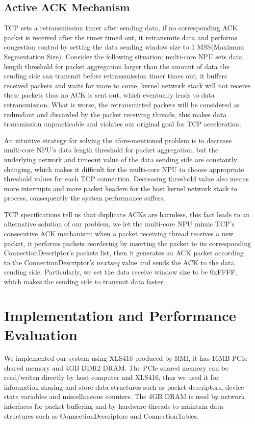 \documentclass[conference]{IEEEtran}
\begin{document}
\subsection{Active ACK Mechanism}
TCP sets a retransmission timer after sending data, if no corresponding ACK packet is received after the timer timed out, it retransmits data and performs congestion control by setting the data sending window size to 1 MSS(Maximum Segmentation Size). Consider the following situation: multi-core NPU sets data length threshold for packet aggregation larger than the amount of data the sending side can transmit before retransmission timer times out, it buffers received packets and waits for more to come, kernel network stack will not receive these packets thus no ACK is sent out, which eventually leads to data retransmission. What is worse, the retransmitted packets will be considered as redundant and discarded by the packet receiving threads, this makes data transmission unpracticable and violates our original goal for TCP acceleration.

 An intuitive strategy for solving the afore-mentioned problem is to decrease multi-core NPU's data length threshold for packet aggregation, but the underlying network and timeout value of the data sending side are constantly changing, which makes it difficult for the multi-core NPU to choose appropriate threshold values for each TCP connection. Decreasing threshold value also means more interrupts and more packet headers for the host kernel network stack to process, consequently the system performance suffers.

 TCP specifications tell us that duplicate ACKs are harmless, this fact leads to an alternative solution of our problem, we let the multi-core NPU mimic TCP's consecutive ACK mechanism: when a packet receiving thread receives a new packet, it performs packets reordering by inserting the packet to its corresponding ConnectionDescriptor's packets list, then it generates an ACK packet according to the ConnectionDescriptor's $nextseq$ value and sends the ACK to the data sending side. Particularly, we set the data receive window size to be 0xFFFF, which makes the sending side to transmit data faster.
\section{Implementation and Performance Evaluation}
We implemented our system using XLS416 produced by RMI, it has 16MB PCIe shared memory and 4GB DDR2 DRAM. The PCIe shared memory can be read/writen directly by host computer and XLS416, thus we used it for information sharing and store data structures such as packet descriptors, device state variables and miscellaneous counters. The 4GB DRAM is used by network interfaces for packet buffering and by hardware threads to maintain data structures such as ConnectionDescriptors and ConnectionTables.
\end{document}
